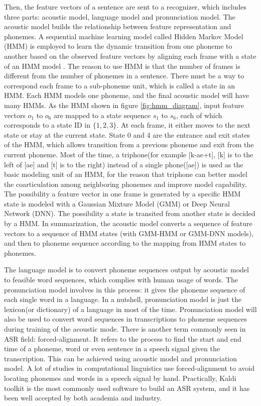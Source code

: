  Then, the feature vectors of a sentence are sent to a recognizer, which includes three parts: acoustic model, language model and pronunciation model. The acoustic model builds the relationship between feature representation and phonemes. A sequential machine learning model called Hidden Markov Model (HMM) is employed to learn the dynamic transition from one phoneme to another based on the observed feature vectors by aligning each frame with a state of an HMM model \citep{rabiner1989tutorial}. The reason to use HMM is that the number of frames is different from the number of phonemes in a sentence. There must be a way to correspond each frame to a sub-phoneme unit, which is called a state in an HMM. Each HMM models one phoneme, and the final acoustic model will have many HMMs. As the HMM shown in figure \ref{fig:hmm_diagram}, input feature vectors $o_1$ to $o_6$ are mapped to a state sequence $s_1$ to $s_6$, each of which corresponds to a state ID in $\{1,2,3\}$. At each frame, it either moves to the next state or stay at the current state. State 0 and 4 are the entrance and exit states of the HMM, which allows transition from a previous phoneme and exit from the current phoneme. Most of the time, a triphone(for example [k-ae+t], [k] is to the left of [ae] and [t] is to the right) instead of a single phone([ae]) is used as the basic modeling unit of an HMM, for the reason that triphone can better model the coarticulation among neighboring phonemes and improve model capability. The possibility a feature vector in one frame is generated by a specific HMM state is modeled with a Gaussian Mixture Model (GMM) or Deep Neural Network (DNN). The possibility a state is transited from another state is decided by a HMM. In summarization, the acoustic model converts a sequence of feature vectors to a sequence of HMM states (with GMM-HMM or GMM-DNN models), and then to phoneme sequence according to the mapping from HMM states to phonemes.

 The language model is to convert phoneme sequences output by acoustic model to feasible word sequences, which complies with human usage of words. The pronunciation model involves in this process: it gives the phoneme sequence of each single word in a language. In a nutshell, pronunciation model is just the lexicon(or dictionary) of a language in most of the time. Pronunciation model will also be used to convert word sequences in transcriptions to phoneme sequences during training of the acoustic mode. There is another term commonly seen in ASR field: forced-alignment. It refers to the process to find the start and end time of a phoneme, word or even sentence in a speech signal given the transcription. This can be achieved using acoustic model and pronunciation model. A lot of studies in computational linguistics use forced-alignment to avoid locating phonemes and words in a speech signal by hand. Practically, Kaldi toolkit \citep{povey2011kaldi} is the most commonly used software to build an ASR system, and it has been well accepted by both academia and industry.

